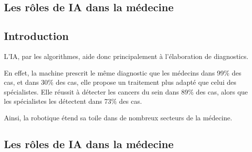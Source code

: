 \begin{titlepage}
	\begin{center}
		\chapter{Les rôles de \textbf{IA} dans la médecine}
		\minitoc

		\vspace{5cm}
		\pgfspectra[element=He,absorption]
	\end{center}
	\vfill %
\end{titlepage}
\pagestyle{monstyle}\setcounter{page}{4}

\section{Introduction}
         L'IA, par les algorithmes, aide donc principalement à l'élaboration de
         diagnostics.

         En effet, la machine prescrit le même diagnostic que les
         médecins dans 99\% des cas, et dans 30\% des cas, elle propose un
         traitement plus adapté que celui des spécialistes. Elle réussit à
         détecter les cancers du sein dans 89\% des cas, alors que les
         spécialistes les détectent dans 73\% des cas.

         Ainsi, la robotique étend sa toile dans de nombreux secteurs de la médecine.
\section{Les rôles de \textbf{IA} dans la médecine}

